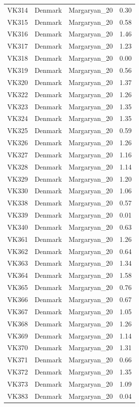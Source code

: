\begin{longtable}[t]{lllr}
VK314 & Denmark & Margaryan\_20 & 0.30\\
VK315 & Denmark & Margaryan\_20 & 0.58\\
VK316 & Denmark & Margaryan\_20 & 1.46\\
VK317 & Denmark & Margaryan\_20 & 1.23\\
VK318 & Denmark & Margaryan\_20 & 0.00\\
VK319 & Denmark & Margaryan\_20 & 0.56\\
VK320 & Denmark & Margaryan\_20 & 1.37\\
VK322 & Denmark & Margaryan\_20 & 1.26\\
VK323 & Denmark & Margaryan\_20 & 1.35\\
VK324 & Denmark & Margaryan\_20 & 1.35\\
VK325 & Denmark & Margaryan\_20 & 0.59\\
VK326 & Denmark & Margaryan\_20 & 1.26\\
VK327 & Denmark & Margaryan\_20 & 1.16\\
VK328 & Denmark & Margaryan\_20 & 1.14\\
VK329 & Denmark & Margaryan\_20 & 1.20\\
VK330 & Denmark & Margaryan\_20 & 1.06\\
VK338 & Denmark & Margaryan\_20 & 0.57\\
VK339 & Denmark & Margaryan\_20 & 0.01\\
VK340 & Denmark & Margaryan\_20 & 0.63\\
VK361 & Denmark & Margaryan\_20 & 1.26\\
VK362 & Denmark & Margaryan\_20 & 0.64\\
VK363 & Denmark & Margaryan\_20 & 1.34\\
VK364 & Denmark & Margaryan\_20 & 1.58\\
VK365 & Denmark & Margaryan\_20 & 0.76\\
VK366 & Denmark & Margaryan\_20 & 0.67\\
VK367 & Denmark & Margaryan\_20 & 1.05\\
VK368 & Denmark & Margaryan\_20 & 1.26\\
VK369 & Denmark & Margaryan\_20 & 1.14\\
VK370 & Denmark & Margaryan\_20 & 1.31\\
VK371 & Denmark & Margaryan\_20 & 0.66\\
VK372 & Denmark & Margaryan\_20 & 1.35\\
VK373 & Denmark & Margaryan\_20 & 1.09\\
VK383 & Denmark & Margaryan\_20 & 0.04\\

\end{longtable}
